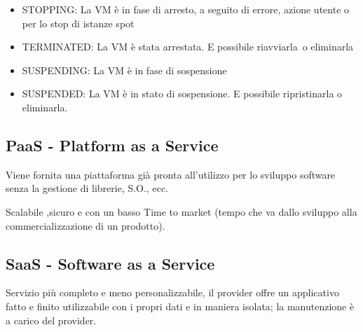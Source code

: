 \documentclass[
]{article}
\providecommand{\tightlist}{%
  \setlength{\itemsep}{0pt}\setlength{\parskip}{0pt}}
\begin{document}
{}

\begin{itemize}
\tightlist
\item
  {STOPPING}{: La VM è in fase di arresto, a seguito di errore, azione
  utente o per lo stop di istanze spot}
\end{itemize}

{}

\begin{itemize}
\tightlist
\item
  {TERMINATED}{: La VM è stata arrestata. E\textquotesingle{} possibile
  }{riavviarla}{~o eliminarla }
\end{itemize}

{}

\begin{itemize}
\tightlist
\item
  {SUSPENDING}{: La VM è in fase di sospensione }
\end{itemize}

{}

\begin{itemize}
\tightlist
\item
  {SUSPENDED}{: La VM è in stato di sospensione. E\textquotesingle{}
  possibile ripristinarla o eliminarla.}
\end{itemize}

{}

\subsection{\texorpdfstring{{PaaS - Platform as a
Service}}{PaaS - Platform as a Service}}\label{h.le3mxle0xcus}

{Viene fornita una piattaforma già pronta all'utilizzo per lo sviluppo
software senza la gestione di librerie, S.O., ecc.}

{Scalabile ,sicuro e con un basso Time to market (tempo che va dallo
sviluppo alla commercializzazione di un prodotto).}

{}

\subsection{\texorpdfstring{{SaaS - Software as a Service
}}{SaaS - Software as a Service }}\label{h.hj0y4o2tgbl}

{Servizio più completo e meno personalizzabile, il provider offre un
applicativo fatto e finito utilizzabile con i propri dati e in maniera
isolata; la manutenzione è a carico del provider.}
\end{document}
